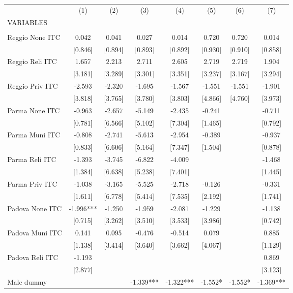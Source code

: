 \begin{tabular}{lccccccc} \hline
 & (1) & (2) & (3) & (4) & (5) & (6) & (7) \\
VARIABLES &  &  &  &  &  &  &  \\ \hline
 &  &  &  &  &  &  &  \\
Reggio None ITC & 0.042 & 0.041 & 0.027 & 0.014 & 0.720 & 0.720 & 0.014 \\
 & [0.846] & [0.894] & [0.893] & [0.892] & [0.930] & [0.910] & [0.858] \\
Reggio Reli ITC & 1.657 & 2.213 & 2.711 & 2.605 & 2.719 & 2.719 & 1.904 \\
 & [3.181] & [3.289] & [3.301] & [3.351] & [3.237] & [3.167] & [3.294] \\
Reggio Priv ITC & -2.593 & -2.320 & -1.695 & -1.567 & -1.551 & -1.551 & -1.901 \\
 & [3.818] & [3.765] & [3.780] & [3.803] & [4.866] & [4.760] & [3.973] \\
Parma None ITC & -0.963 & -2.657 & -5.149 & -2.435 & -0.241 &  & -0.711 \\
 & [0.781] & [6.566] & [5.102] & [7.304] & [1.465] &  & [0.792] \\
Parma Muni ITC & -0.808 & -2.741 & -5.613 & -2.954 & -0.389 &  & -0.937 \\
 & [0.833] & [6.606] & [5.164] & [7.347] & [1.504] &  & [0.878] \\
Parma Reli ITC & -1.393 & -3.745 & -6.822 & -4.009 &  &  & -1.468 \\
 & [1.384] & [6.638] & [5.238] & [7.401] &  &  & [1.445] \\
Parma Priv ITC & -1.038 & -3.165 & -5.525 & -2.718 & -0.126 &  & -0.331 \\
 & [1.611] & [6.778] & [5.414] & [7.535] & [2.192] &  & [1.741] \\
Padova None ITC & -1.996*** & -1.250 & -1.959 & -2.081 & -1.229 &  & -1.138 \\
 & [0.715] & [3.262] & [3.510] & [3.533] & [3.986] &  & [0.742] \\
Padova Muni ITC & 0.141 & 0.095 & -0.476 & -0.514 & 0.079 &  & 0.885 \\
 & [1.138] & [3.414] & [3.640] & [3.662] & [4.067] &  & [1.129] \\
Padova Reli ITC & -1.193 &  &  &  &  &  & 0.869 \\
 & [2.877] &  &  &  &  &  & [3.123] \\
Male dummy &  &  & -1.339*** & -1.322*** & -1.552* & -1.552* & -1.369*** \\

\end{tabular}
